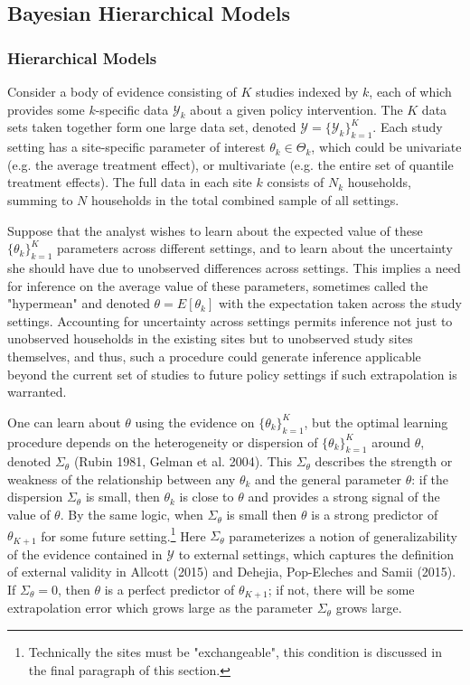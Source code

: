 \documentclass[english,12pt]{article}\usepackage{lmodern}
\numberwithin{equation}{section}
\begin{document}
\subsection{Bayesian Hierarchical Models}

\subsubsection{Hierarchical Models}

Consider a body of evidence consisting of $K$ studies indexed by $k$, each of which provides some $k$-specific data $\mathcal{Y}_k$ about a given policy intervention. The $K$ data sets taken together form one large data set, denoted $\mathcal{Y} = \{    \mathcal{Y}_k \}_{k=1}^K$. Each study setting has a site-specific parameter of interest $\theta_k \in \Theta_k$, which could be univariate (e.g. the average treatment effect), or multivariate (e.g. the entire set of quantile treatment effects). The full data in each site $k$ consists of $N_k$ households, summing to $N$ households in the total combined sample of all settings.

Suppose that the analyst wishes to learn about the expected value of these  $\{\theta_k\}^K_{k=1}$ parameters across different settings, and to learn about the uncertainty she should have due to unobserved differences across settings. This implies a need for inference on the average value of these parameters, sometimes called the "hypermean" and denoted $\theta = E[\theta_k]$ with the expectation taken across the study settings. Accounting for uncertainty across settings permits inference not just to unobserved households in the existing sites but to unobserved study sites themselves, and thus, such a procedure could generate inference applicable beyond the current set of studies to future policy settings if such extrapolation is warranted.  

 One can learn about $\theta$ using the evidence on $ \{ \theta_k \}_{k=1}^K$, but the optimal learning procedure depends on the heterogeneity or dispersion of $ \{ \theta_k \}_{k=1}^K$ around $\theta$, denoted $\Sigma_{\theta}$ (Rubin 1981, Gelman et al. 2004). This $\Sigma_{\theta}$ describes the strength or weakness of the relationship between any $\theta_k$ and the general parameter $\theta$: if the dispersion $\Sigma_{\theta}$  is small, then $\theta_k$ is close to $\theta$ and provides a strong signal of the value of $\theta$. By the same logic, when $\Sigma_{\theta}$ is small then $\theta$ is a strong predictor of $\theta_{K+1}$ for some future setting.\footnote{Technically the sites must be "exchangeable", this condition is discussed in the final paragraph of this section.} Here $\Sigma_{\theta}$ parameterizes a notion of generalizability of the evidence contained in $\mathcal{Y}$ to external settings, which captures the definition of external validity in Allcott (2015) and Dehejia, Pop-Eleches and Samii (2015). If $\Sigma_{\theta} = 0$, then $\theta$ is a perfect predictor of $\theta_{K+1}$; if not, there will be some extrapolation error which grows large as the parameter $\Sigma_{\theta}$ grows large.
\end{document}
